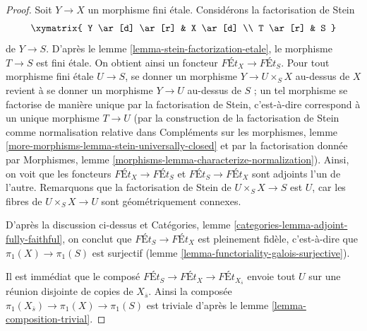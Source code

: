 \begin{proof}
Soit $Y \to X$ un morphisme fini \'etale. Considérons la factorisation de Stein
$$
\xymatrix{
Y \ar[d] \ar[r] & X \ar[d] \\
T \ar[r] & S
}
$$
de $Y \to S$. D'après le lemme \ref{lemma-stein-factorization-etale},
le morphisme $T \to S$ est fini \'etale. On obtient ainsi
un foncteur $\textit{F\'Et}_X \to \textit{F\'Et}_S$.
Pour tout morphisme fini \'etale $U \to S$, se donner un morphisme
$Y \to U \times_S X$ au-dessus de $X$ revient à se donner un morphisme
$Y \to U$ au-dessus de $S$ ; un tel morphisme se factorise de manière unique par
la factorisation de Stein, c'est-à-dire correspond à un unique
morphisme $T \to U$
(par la construction de la factorisation de Stein comme
normalisation relative dans Compléments sur les morphismes, lemme
\ref{more-morphisms-lemma-stein-universally-closed}
et par la factorisation donnée par
Morphismes, lemme \ref{morphisms-lemma-characterize-normalization}).
Ainsi, on voit que les foncteurs
$\textit{F\'Et}_X \to \textit{F\'Et}_S$ et
$\textit{F\'Et}_S \to \textit{F\'Et}_X$ sont adjoints l'un de l'autre.
Remarquons que la factorisation de Stein de $U \times_S X \to S$ est
$U$, car les fibres de $U \times_S X \to U$ sont géométriquement connexes.

\medskip\noindent
D'après la discussion ci-dessus et
Catégories, lemme \ref{categories-lemma-adjoint-fully-faithful},
on conclut que
$\textit{F\'Et}_S \to \textit{F\'Et}_X$
est pleinement fidèle, c'est-à-dire que $\pi_1(X) \to \pi_1(S)$ est surjectif
(lemme \ref{lemma-functoriality-galois-surjective}).

\medskip\noindent
Il est immédiat que le composé
$\textit{F\'Et}_S \to \textit{F\'Et}_X \to \textit{F\'Et}_{X_{\overline{s}}}$
envoie tout $U$ sur une réunion disjointe de copies de $X_{\overline{s}}$.
Ainsi la composée $\pi_1(X_{\overline{s}}) \to \pi_1(X) \to \pi_1(S)$ est triviale
d'après le lemme \ref{lemma-composition-trivial}.


\end{proof}
